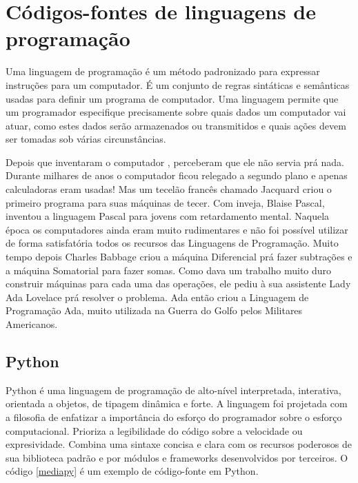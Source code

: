 \section{Códigos-fontes de linguagens de programação}

Uma linguagem de programação é um método padronizado para expressar instruções para um computador. É um conjunto de regras sintáticas e semânticas usadas para definir um programa de computador. Uma linguagem permite que um programador especifique precisamente sobre quais dados um computador vai atuar, como estes dados serão armazenados ou transmitidos e quais ações devem ser tomadas sob várias circunstâncias.

Depois que inventaram o computador , perceberam que ele não servia prá nada. Durante milhares de anos o computador ficou relegado a segundo plano e apenas calculadoras eram usadas! Mas um tecelão francês chamado Jacquard criou o primeiro programa para suas máquinas de tecer. Com inveja, Blaise Pascal, inventou a linguagem Pascal para jovens com retardamento mental. Naquela época os computadores ainda eram muito rudimentares e não foi possível utilizar de forma satisfatória todos os recursos das Linguagens de Programação. Muito tempo depois Charles Babbage criou a máquina Diferencial prá fazer subtrações e a máquina Somatorial para fazer somas. Como dava um trabalho muito duro construir máquinas para cada uma das operações, ele pediu à sua assistente Lady Ada Lovelace prá resolver o problema. Ada então criou a Linguagem de Programação Ada, muito utilizada na Guerra do Golfo pelos Militares Americanos.

\subsection{Python}

Python é uma linguagem de programação de alto-nível interpretada, interativa, orientada a objetos, de tipagem dinâmica e forte. A linguagem foi projetada com a filosofia de enfatizar a importância do esforço do programador sobre o esforço computacional. Prioriza a legibilidade do código sobre a velocidade ou expresividade. Combina uma sintaxe concisa e clara com os recursos poderosos de sua biblioteca padrão e por módulos e frameworks desenvolvidos por terceiros. O código \ref{mediapy} é um exemplo de código-fonte em Python.



